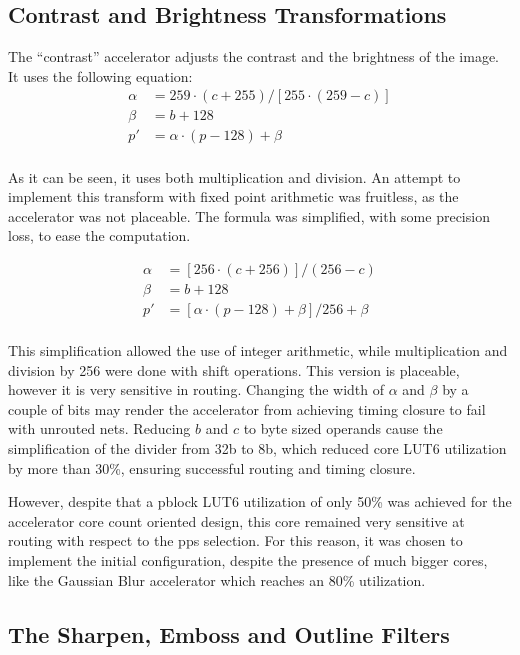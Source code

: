 \subsection{Contrast and Brightness Transformations}

The ``contrast'' accelerator adjusts the contrast and the brightness of the image.
It uses the following equation:
\[
\begin{array}{ll}
	\alpha	&= 259 \cdot (c + 255) / \left[ 255 \cdot (259 - c) \right] \\
	\beta	&= b + 128\\
	p' &= \alpha \cdot ( p - 128) + \beta\\
\end{array}
\]

As it can be seen, it uses both multiplication and division. An attempt to implement this
transform with fixed point arithmetic was fruitless, as the accelerator was not
placeable. The formula was simplified, with some precision loss, to ease the computation.

\[
\begin{array}{ll}
	\alpha &= \left[ 256 \cdot (c+256)  \right] / (256 - c) \\
	\beta &= b + 128\\
	p' &= \left[ \alpha \cdot (p - 128) + \beta \right] / 256 + \beta\\
\end{array}
\]

This simplification allowed the use of integer arithmetic, while multiplication
and division by 256 were done with shift operations. This version is placeable,
however it is very sensitive in routing. 
Changing the width of $\alpha$ and $\beta$ by a couple of bits
may render the accelerator from achieving timing closure to fail with unrouted nets.
Reducing $b$ and $c$ to byte sized operands cause the simplification of the divider
from 32b to 8b, which reduced core LUT6 utilization by more than 30\%, ensuring
successful routing and timing closure.

However, despite that a \gls{pblock} LUT6 utilization of only 50\% was achieved
for the accelerator core count oriented design,
this core remained very sensitive at routing with respect to the \glspl{pp} selection.
For this reason, it was chosen to implement the initial configuration,
despite the presence of much bigger cores, like the Gaussian Blur accelerator
which reaches an 80\% utilization.

\subsection{The Sharpen, Emboss and Outline Filters}

